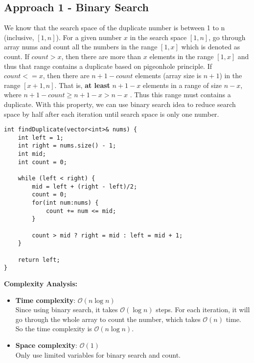 \documentclass[justified]{tufte-book}
\begin{document}
\subsection{Approach 1 - Binary Search}
We know that the search space of the duplicate number is between 1 to n (inclusive, $[1, n]$). For a given number $x$ in the search space $[1, n]$, go through array nums and count all the numbers in the range $[1, x]$ which is denoted as count. If $count > x$, then there are more than $x$ elements in the range $[1, x]$ and thus that range contains a duplicate based on pigeonhole principle. If $count <= x$, then there are $n + 1 - count$ elements (array size is $n+1$) in the range $[x+1, n]$. That is, \textbf{at least} $n + 1 - x$ elements in a range of size $n - x$, where $n + 1 - count \geq n + 1 - x > n - x$ . Thus this range must contains a duplicate.  With this property, we can use binary search idea to reduce search space by half after each iteration until search space is only one number.  

\begin{lstlisting}
int findDuplicate(vector<int>& nums) {
    int left = 1;
    int right = nums.size() - 1;
    int mid;
    int count = 0;
    
    while (left < right) {
        mid = left + (right - left)/2;
        count = 0;
        for(int num:nums) {
            count += num <= mid;
        }
        
        count > mid ? right = mid : left = mid + 1;
    }
    
    return left;
}
\end{lstlisting}

\noindent \textbf{Complexity Analysis:}
\begin{itemize}
    \item \textbf{Time complexity}: $\mathcal{O}(n\log n)$ \\
    Since using binary search, it takes $\mathcal{O}(\log n)$ steps. For each iteration, it will go through the whole array to count the number, which takes $\mathcal{O}(n)$ time. So the time complexity is $\mathcal{O}(n\log n)$.
    \item \textbf{Space complexity}: $\mathcal{O}(1)$ \\
    Only use limited variables for binary search and count.
\end{itemize}
\end{document}
